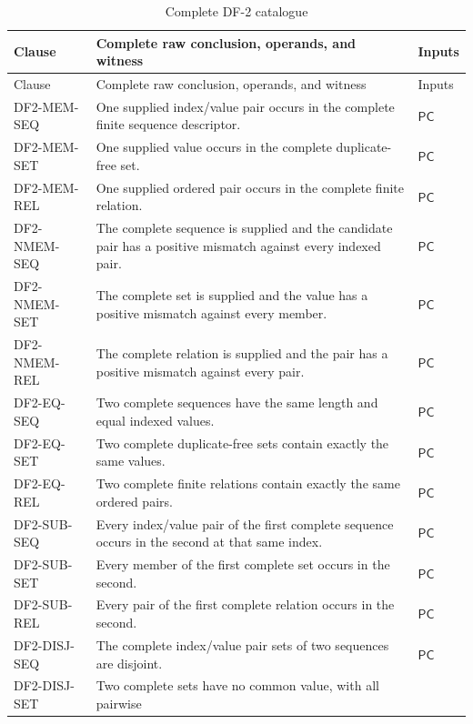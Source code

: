\documentclass[11pt,twoside]{article}
\begin{document}
\begin{longtable}{>{\raggedright\arraybackslash}p{}
                  >{\raggedright\arraybackslash}p{}
                  >{\raggedright\arraybackslash}p{}}
\caption{Complete DF-2 catalogue}\label{tab:df2}\\
\toprule
Clause & Complete raw conclusion, operands, and witness & Inputs\\
\midrule
\endfirsthead%
\toprule
Clause & Complete raw conclusion, operands, and witness & Inputs\\
\midrule
\endhead%
DF2-MEM-SEQ & One supplied index/value pair occurs in the complete finite
sequence descriptor. & \(\mathsf{PC}\)\\
DF2-MEM-SET & One supplied value occurs in the complete duplicate-free set. &
\(\mathsf{PC}\)\\
DF2-MEM-REL & One supplied ordered pair occurs in the complete finite relation. &
\(\mathsf{PC}\)\\
DF2-NMEM-SEQ & The complete sequence is supplied and the candidate pair has a
positive mismatch against every indexed pair. & \(\mathsf{PC}\)\\
DF2-NMEM-SET & The complete set is supplied and the value has a positive mismatch
against every member. & \(\mathsf{PC}\)\\
DF2-NMEM-REL & The complete relation is supplied and the pair has a positive
mismatch against every pair. & \(\mathsf{PC}\)\\
DF2-EQ-SEQ & Two complete sequences have the same length and equal indexed values.
& \(\mathsf{PC}\)\\
DF2-EQ-SET & Two complete duplicate-free sets contain exactly the same values. &
\(\mathsf{PC}\)\\
DF2-EQ-REL & Two complete finite relations contain exactly the same ordered pairs.
& \(\mathsf{PC}\)\\
DF2-SUB-SEQ & Every index/value pair of the first complete sequence occurs in the
second at that same index. & \(\mathsf{PC}\)\\
DF2-SUB-SET & Every member of the first complete set occurs in the second. &
\(\mathsf{PC}\)\\
DF2-SUB-REL & Every pair of the first complete relation occurs in the second. &
\(\mathsf{PC}\)\\
DF2-DISJ-SEQ & The complete index/value pair sets of two sequences are disjoint. &
\(\mathsf{PC}\)\\
DF2-DISJ-SET & Two complete sets have no common value, with all pairwise

\end{longtable}
\end{document}
